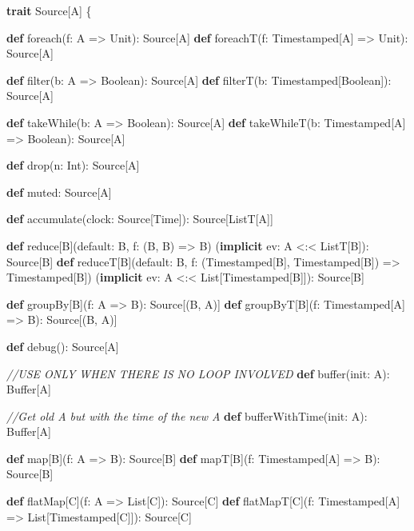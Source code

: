 \documentclass[12pt,]{article}
\newenvironment{Shaded}{\begin{snugshade}}{\end{snugshade}}
\newcommand{\KeywordTok}[1]{\textcolor[rgb]{0.13,0.29,0.53}{\textbf{#1}}}
\newcommand{\CommentTok}[1]{\textcolor[rgb]{0.56,0.35,0.01}{\textit{#1}}}
\newcommand{\FunctionTok}[1]{\textcolor[rgb]{0.00,0.00,0.00}{#1}}
\newcommand{\NormalTok}[1]{#1}
\begin{document}
\begin{Shaded}
\begin{Highlighting}[]

\KeywordTok{trait}\NormalTok{ Source[A] \{}

    \KeywordTok{def} \FunctionTok{foreach}\NormalTok{(f: A => Unit): Source[A]}
    \KeywordTok{def} \FunctionTok{foreachT}\NormalTok{(f: Timestamped[A] => Unit): Source[A]}
    
    \KeywordTok{def} \FunctionTok{filter}\NormalTok{(b: A => Boolean): Source[A]}
    \KeywordTok{def} \FunctionTok{filterT}\NormalTok{(b: Timestamped[Boolean]): Source[A] }
    
    \KeywordTok{def} \FunctionTok{takeWhile}\NormalTok{(b: A => Boolean): Source[A]}
    \KeywordTok{def} \FunctionTok{takeWhileT}\NormalTok{(b: Timestamped[A] => Boolean): Source[A] }
    
    \KeywordTok{def} \FunctionTok{drop}\NormalTok{(n: Int): Source[A]     }
    
    \KeywordTok{def}\NormalTok{ muted: Source[A]    }
    
    \KeywordTok{def} \FunctionTok{accumulate}\NormalTok{(clock: Source[Time]): Source[ListT[A]]}
    
    \KeywordTok{def}\NormalTok{ reduce[B](default: B, f: (B, B) => B)}
\NormalTok{        (}\KeywordTok{implicit}\NormalTok{ ev: A <:< ListT[B]): Source[B]}
    \KeywordTok{def}\NormalTok{ reduceT[B](default: B,}
\NormalTok{                  f: (Timestamped[B], Timestamped[B]) => Timestamped[B])}
\NormalTok{        (}\KeywordTok{implicit}\NormalTok{ ev: A <:< List[Timestamped[B]]): Source[B]}

    \KeywordTok{def}\NormalTok{ groupBy[B](f: A => B): Source[(B, A)]}
    \KeywordTok{def}\NormalTok{ groupByT[B](f: Timestamped[A] => B): Source[(B, A)] }
  
    \KeywordTok{def} \FunctionTok{debug}\NormalTok{(): Source[A]}

    \CommentTok{//USE ONLY WHEN THERE IS NO LOOP INVOLVED}
    \KeywordTok{def} \FunctionTok{buffer}\NormalTok{(init: A): Buffer[A]}

    \CommentTok{//Get old A but with the time of the new A}
    \KeywordTok{def} \FunctionTok{bufferWithTime}\NormalTok{(init: A): Buffer[A]}

    \KeywordTok{def}\NormalTok{ map[B](f: A => B): Source[B]}
    \KeywordTok{def}\NormalTok{ mapT[B](f: Timestamped[A] => B): Source[B]}

    \KeywordTok{def}\NormalTok{ flatMap[C](f: A => List[C]): Source[C]}
    \KeywordTok{def}\NormalTok{ flatMapT[C](f: Timestamped[A] => List[Timestamped[C]]): Source[C]   }


\end{Highlighting}
\end{Shaded}
\end{document}
